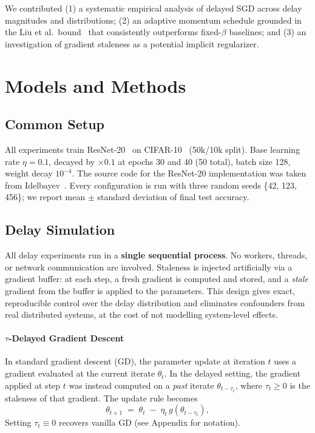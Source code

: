 \documentclass[10pt,conference,compsocconf]{IEEEtran}
\begin{document}
We contributed (1) a systematic empirical analysis of delayed SGD across delay
magnitudes and distributions; (2) an adaptive momentum schedule grounded in
the Liu et al.\ bound~\cite{liu2018momentum} that consistently outperforms
fixed-$\beta$ baselines; and (3) an investigation of gradient staleness as a
potential implicit regularizer.

\section{Models and Methods}
\label{sec:methods}

\subsection{Common Setup}
\label{common_setup}

All experiments train ResNet-20~\cite{he2016resnet} on
CIFAR-10~\cite{krizhevsky2009cifar} (50k/10k split).
Base learning rate $\eta{=}0.1$, decayed by $\times 0.1$ at epochs 30 and
40 (50 total), batch size 128, weight decay $10^{-4}$. The source code for the ResNet-20 implementation was taken from Idelbayev~\cite{Idelbayev18a}. 
Every configuration is run with three random seeds \{42, 123, 456\}; we
report mean $\pm$ standard deviation of final test accuracy.

\subsection{Delay Simulation}

All delay experiments run in a \textbf{single sequential process}.
No workers, threads, or network communication are involved.
Staleness is injected artificially via a gradient buffer: at each step,
a fresh gradient is computed and stored, and a \emph{stale} gradient
from the buffer is applied to the parameters.
This design gives exact, reproducible control over the delay distribution
and eliminates confounders from real distributed systems, at the cost of
not modelling system-level effects.

\paragraph{$\tau$-Delayed Gradient Descent}
In standard gradient descent (GD), the parameter update at iteration
$t$ uses a gradient evaluated at the current iterate $\theta_t$. In the
delayed setting, the gradient applied at step $t$ was instead computed on
a \emph{past} iterate $\theta_{t-\tau_t}$, where $\tau_t \geq 0$ is the
staleness of that gradient. The update rule becomes
\begin{equation}
    \theta_{t+1} \;=\; \theta_t \;-\; \eta_t \, g\!\left(\theta_{t-\tau_t}\right),
    \label{eq:delayed-sgd}
\end{equation}
Setting $\tau_t \equiv 0$ recovers vanilla GD (see Appendix for notation).
\end{document}
